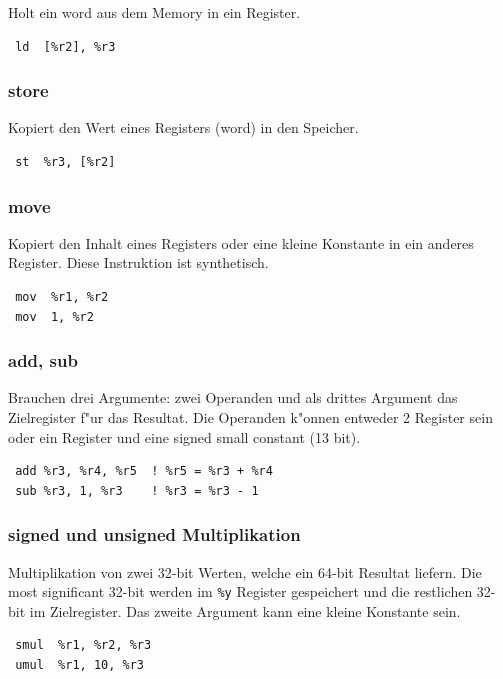 \documentclass[german, 10pt, a4paper, twocolumn]{scrartcl}
\begin{document}
Holt ein word aus dem Memory in ein Register.

\begin{verbatim}
 ld  [%r2], %r3
\end{verbatim}

\subsubsection{store}

Kopiert den Wert eines Registers (word) in den Speicher.

\begin{verbatim}
 st  %r3, [%r2]
\end{verbatim}

\subsubsection{move}

Kopiert den Inhalt eines Registers oder eine kleine Konstante in ein anderes Register. Diese Instruktion ist synthetisch.

\begin{verbatim}
 mov  %r1, %r2
 mov  1, %r2
\end{verbatim}

\subsubsection{add, sub}

Brauchen drei Argumente: zwei Operanden und als drittes Argument das Zielregister f"ur das Resultat. Die Operanden k"onnen entweder 2 Register sein oder ein Register und eine signed small constant (13 bit).

\begin{verbatim}
 add %r3, %r4, %r5  ! %r5 = %r3 + %r4
 sub %r3, 1, %r3    ! %r3 = %r3 - 1
\end{verbatim}

\subsubsection{signed und unsigned Multiplikation}

Multiplikation von zwei 32-bit Werten, welche ein 64-bit Resultat liefern. Die most significant 32-bit werden im \verb#%y# Register gespeichert und die restlichen 32-bit im Zielregister. Das zweite Argument kann eine kleine Konstante sein.

\begin{verbatim}
 smul  %r1, %r2, %r3
 umul  %r1, 10, %r3
\end{verbatim}
\end{document}
